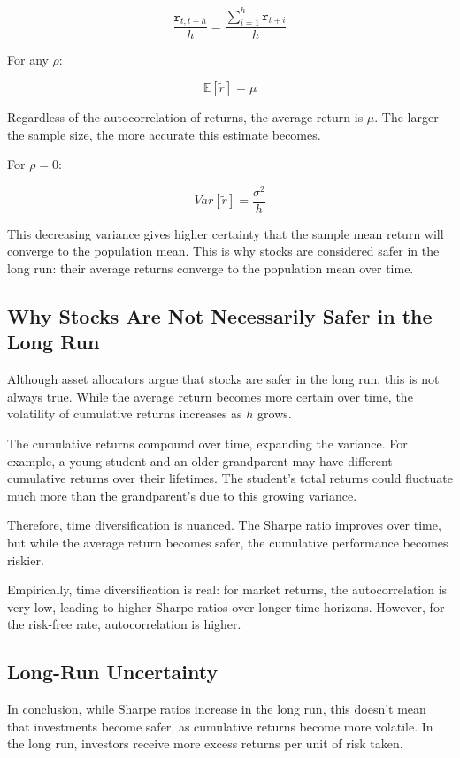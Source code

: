 \documentclass{article}
\begin{document}
\[
\frac{\texttt{r}_{t, t+h}}{h} = \frac{\sum_{i=1}^{h}\texttt{r}_{t+i}}{h}
\]

For any \( \rho \):

\[
\mathbb{E}[\tilde{r}] = \mu
\]

Regardless of the autocorrelation of returns, the average return is \( \mu \). The larger the sample size, the more accurate this estimate becomes.

For \( \rho = 0 \):

\[
Var[\tilde{r}] = \frac{\sigma^2}{h}
\]

This decreasing variance gives higher certainty that the sample mean return will converge to the population mean. This is why stocks are considered safer in the long run: their average returns converge to the population mean over time.

\subsection{Why Stocks Are Not Necessarily Safer in the Long Run}
Although asset allocators argue that stocks are safer in the long run, this is not always true. While the average return becomes more certain over time, the volatility of cumulative returns increases as \( h \) grows.

The cumulative returns compound over time, expanding the variance. For example, a young student and an older grandparent may have different cumulative returns over their lifetimes. The student's total returns could fluctuate much more than the grandparent's due to this growing variance.

Therefore, time diversification is nuanced. The Sharpe ratio improves over time, but while the average return becomes safer, the cumulative performance becomes riskier.

Empirically, time diversification is real: for market returns, the autocorrelation is very low, leading to higher Sharpe ratios over longer time horizons. However, for the risk-free rate, autocorrelation is higher.

\subsection{Long-Run Uncertainty}
In conclusion, while Sharpe ratios increase in the long run, this doesn't mean that investments become safer, as cumulative returns become more volatile. In the long run, investors receive more excess returns per unit of risk taken.
\end{document}

